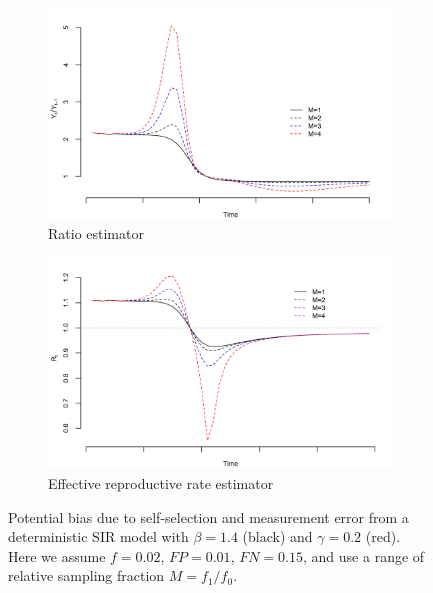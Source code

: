 \documentclass[12pt]{article}
\begin{document}
\begin{figure}[!th]
\centering
\begin{subfigure}{.5\textwidth}
  \centering
  \includegraphics[width=.9\linewidth]{../methods/figs/sir_ratio.png}
  \caption{Ratio estimator}
  \label{fig:ratio-bias}
\end{subfigure}%
\begin{subfigure}{.5\textwidth}
  \centering
  \includegraphics[width=.9\linewidth]{../methods/figs/sir_rt.png}
  \caption{Effective reproductive rate estimator}
  \label{fig:r0-bias}
\end{subfigure}
\caption{Potential bias due to self-selection and measurement error from a deterministic SIR model with $\beta = 1.4$ (black) and $\gamma = 0.2$ (red).  Here we assume $f = 0.02$, $FP = 0.01$, $FN = 0.15$, and use a range of relative sampling fraction $M = f_1/f_0$.}
\label{fig:rates}
\end{figure}
\end{document}

